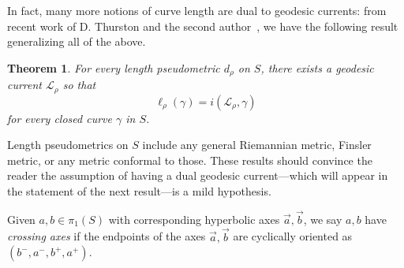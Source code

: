 \documentclass[12pt]{amsart}
\numberwithin{equation}{section}
\numberwithin{figure}{section}
\newtheorem{theorem}[equation]{Theorem}
\theoremstyle{definition}
\theoremstyle{plain}
\newcommand{\ora}[1]{\overrightarrow{#1}}
\begin{document}
 In fact, many more notions of curve length are dual to geodesic currents: from recent work of D. Thurston and the second author~\cite[Corollary~B]{MGT25:Intersections}, we have the following result generalizing all of the above.
  
\begin{theorem}
For every length pseudometric $d_\rho$ on $S$, there exists a geodesic current $\mathcal{L}_{\rho}$ so that
\begin{equation}
\ell_{\rho}(\gamma)=i(\mathcal{L}_\rho,\gamma)
\label{eq:dual_current}
\end{equation}
for every closed curve $\gamma$ in $S$.
\label{thm:intersections}
\end{theorem}

Length pseudometrics on $S$ include any general Riemannian metric, Finsler metric, or any metric conformal to those. These results should convince the reader the assumption of having a dual geodesic current---which will appear in the statement of the next result---is a mild hypothesis.

Given $a, b \in \pi_1(S)$ with corresponding hyperbolic axes $\ora{a},\ora{b}$, we say $a,b$ have \emph{crossing axes} if the endpoints of the axes $\ora{a},\ora{b}$ are cyclically oriented as $(b^-, a^-, b^+, a^+)$.
\end{document}
